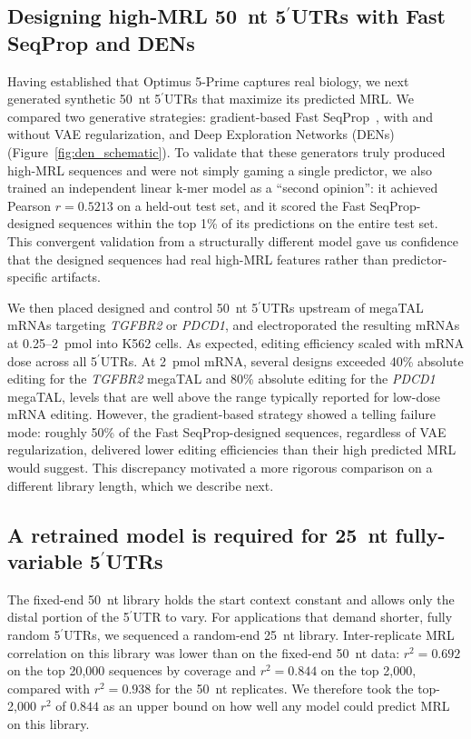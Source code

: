 \documentclass[11pt]{article}
\begin{document}
\subsection{Designing high-MRL 50~nt 5$^\prime$UTRs with Fast SeqProp and DENs}

Having established that Optimus 5-Prime captures real biology, we next
generated synthetic 50~nt 5$^\prime$UTRs that maximize its predicted MRL.
We compared two generative strategies: gradient-based Fast
SeqProp~\citep{linder2021fastseqprop}, with and without VAE
regularization, and Deep Exploration Networks (DENs)~\citep{linder2020den}
(Figure~\ref{fig:den_schematic}). To validate that these generators
truly produced high-MRL sequences and were not simply gaming a single
predictor, we also trained an independent linear k-mer model as a
``second opinion'': it achieved Pearson $r = 0.5213$ on a held-out test
set, and it scored the Fast SeqProp-designed sequences within the top
1\% of its predictions on the entire test set. This convergent
validation from a structurally different model gave us confidence that
the designed sequences had real high-MRL features rather than
predictor-specific artifacts.

We then placed designed and control 50~nt 5$^\prime$UTRs upstream of
megaTAL mRNAs targeting \emph{TGFBR2} or \emph{PDCD1}, and
electroporated the resulting mRNAs at 0.25--2~pmol into K562 cells. As
expected, editing efficiency scaled with mRNA dose across all
5$^\prime$UTRs. At 2~pmol mRNA, several designs exceeded 40\% absolute
editing for the \emph{TGFBR2} megaTAL and 80\% absolute editing for the
\emph{PDCD1} megaTAL, levels that are well above the range typically
reported for low-dose mRNA editing. However, the gradient-based
strategy showed a telling failure mode: roughly 50\% of the Fast
SeqProp-designed sequences, regardless of VAE regularization,
delivered lower editing efficiencies than their high predicted MRL
would suggest. This discrepancy motivated a more rigorous comparison
on a different library length, which we describe next.

\subsection{A retrained model is required for 25~nt fully-variable 5$^\prime$UTRs}

The fixed-end 50~nt library holds the start context constant and allows
only the distal portion of the 5$^\prime$UTR to vary. For applications
that demand shorter, fully random 5$^\prime$UTRs, we sequenced a
random-end 25~nt library. Inter-replicate MRL correlation on this
library was lower than on the fixed-end 50~nt data:
$r^{2} = 0.692$ on the top 20{,}000 sequences by coverage and
$r^{2} = 0.844$ on the top 2{,}000, compared with $r^{2} = 0.938$ for
the 50~nt replicates. We therefore took the top-2{,}000 $r^{2}$ of
$0.844$ as an upper bound on how well any model could predict MRL on
this library.
\end{document}

